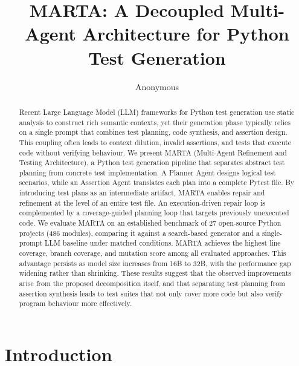\documentclass{llncs}
\begin{document}
\title{MARTA: A Decoupled Multi-Agent Architecture for Python Test Generation}


\author{Anonymous}
\maketitle

\begin{abstract}

Recent Large Language Model (LLM) frameworks for Python test generation use static analysis to construct rich semantic contexts, yet their generation phase typically relies on a single prompt that combines test planning, code synthesis, and assertion design. This coupling often leads to context dilution, invalid assertions, and tests that execute code without verifying behaviour. We present MARTA (Multi-Agent Refinement and Testing Architecture), a Python test generation pipeline that separates abstract test planning from concrete test implementation. A Planner Agent designs logical test scenarios, while an Assertion Agent translates each plan into a complete Pytest file. By introducing test plans as an intermediate artifact, MARTA enables repair and refinement at the level of an entire test file. An execution-driven repair loop is complemented by a coverage-guided planning loop that targets previously unexecuted code.
%
We evaluate MARTA on an established benchmark of 27 open-source Python projects (486 modules), comparing it against a search-based generator and a single-prompt LLM baseline under matched conditions. MARTA achieves the highest line coverage, branch coverage, and mutation score among all evaluated approaches. This advantage persists as model size increases from 16B to 32B, with the performance gap widening rather than shrinking. These results suggest that the observed improvements arise from the proposed decomposition itself, and that separating test planning from assertion synthesis leads to test suites that not only cover more code but also verify program behaviour more effectively.

\end{abstract}



\section{Introduction}
\end{document}
